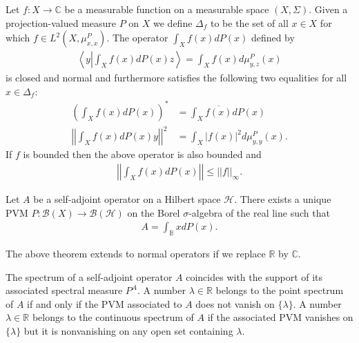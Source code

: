     \begin{property}
        Let $f:X\rightarrow\mathbb{C}$ be a measurable function on a measurable space $(X,\Sigma)$. Given a projection-valued measure $P$ on $X$ we define $\Delta_f$ to be the set of all $x\in X$ for which $f\in L^2(X, \mu^P_{x,x})$. The operator $\int_Xf(x)dP(x)$ defined by
        \begin{gather}
            \left\langle y\left|\int_Xf(x)dP(x)z\right.\right\rangle = \int_Xf(x)d\mu^P_{y,z}(x)
        \end{gather}
        is closed and normal and furthermore satisfies the following two equalities for all $x\in\Delta_f$:
        \begin{align}
            \left(\int_Xf(x)dP(x)\right)^* &= \int_X\overline{f(x)}dP(x)\\
            \left|\left|\int_Xf(x)dP(x)y\right|\right|^2 &= \int_X|f(x)|^2d\mu^P_{y,y}(x).
        \end{align}
        If $f$ is bounded then the above operator is also bounded and
        \begin{gather}
            \left|\left|\int_Xf(x)dP(x)\right|\right|\leq||f||_\infty.
        \end{gather}
    \end{property}

    \begin{theorem}
        Let $A$ be a self-adjoint operator on a Hilbert space $\mathcal{H}$. There exists a unique PVM $P:\mathcal{B}(X)\rightarrow\mathcal{B}(\mathcal{H})$ on the Borel $\sigma$-algebra of the real line such that
        \begin{gather}
            A = \int_{\mathbb{B}}xdP(x).
        \end{gather}
    \end{theorem}
    \begin{remark}
        The above theorem extends to normal operators if we replace $\mathbb{R}$ by $\mathbb{C}$.
    \end{remark}
    \begin{property}
        The spectrum of a self-adjoint operator $A$ coincides with the support of its associated spectral measure $P^A$. A number $\lambda\in\mathbb{R}$ belongs to the point spectrum of $A$ if and only if the PVM associated to $A$ does not vanish on $\{\lambda\}$. A number $\lambda\in\mathbb{R}$ belongs to the continuous spectrum of $A$ if the associated PVM vanishes on $\{\lambda\}$ but it is nonvanishing on any open set containing $\lambda$.
    \end{property}

